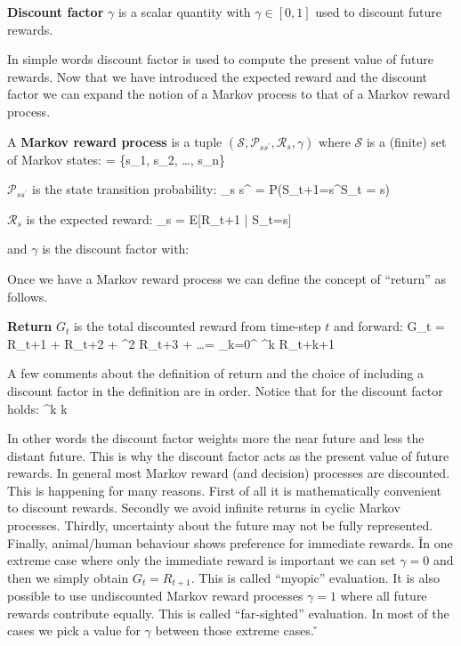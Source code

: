 \textbf{Discount factor} $\gamma$ is a scalar quantity with $\gamma \in [0,1]$ used to discount future rewards.
\ed

In simple words discount factor is used to compute the present value of future rewards. Now that we have introduced 
the expected reward and the discount factor we can expand the notion of a Markov process to that of a Markov reward 
process.

A \textbf{Markov reward process} is a tuple $(\mathcal{S}, \mathcal{P}_{s s^\prime}, \mathcal{R}_{s}, \gamma)$ 
where $\mathcal{S}$ is a (finite) set of Markov states:
\bse
{} = \{s_1, s_2, \ldots, s_n\}
\ese

$\mathcal{P}_{s s^\prime}$ is the state transition probability:
\bse
{}_{s s^\prime} = P(S_{t+1}=s^\prime \mid S_{t} = s)
\ese

$\mathcal{R}_{s}$ is the expected reward:
\bse
{}_{s} = E[R_{t+1} | S_t=s]
\ese

and $\gamma$ is the discount factor with:
\bse
\gamma \in [0,1]
\ese
\ed

Once we have a Markov reward process we can define the concept of ``return'' as follows.

\bd[Return]
\textbf{Return} $G_t$ is the total discounted reward from time-step $t$ and forward:
\bse
G_t = R_{t+1} + \gamma R_{t+2} + \gamma^2 R_{t+3} + \ldots = \sum_{k=0}^{\infty} \gamma^k R_{t+k+1}
\ese
\ed

A few comments about the definition of return and the choice of including a discount factor in the definition are in 
order. Notice that for the discount factor holds:
\bse
\gamma \in [0,1] \Rightarrow \gamma^k   k \to \infty
\ese

In other words the discount factor weights more the near future and less the distant future. This is why the discount
factor acts as the present value of future rewards. In general most Markov reward (and decision) processes are 
discounted. This is happening for many reasons. First of all it is mathematically convenient to discount rewards. 
Secondly we avoid infinite returns in cyclic Markov processes. Thirdly, uncertainty about the future may not be fully
represented. Finally, animal/human behaviour shows preference for immediate rewards. \v

In one extreme case where only the immediate reward is important we can set $\gamma = 0$ and then we simply obtain 
$G_t = R_{t+1}$. This is called ``myopic'' evaluation. It is also possible to use undiscounted Markov reward processes
$\gamma = 1$ where all future rewards contribute equally. This is called ``far-sighted'' evaluation. In most of the 
cases we pick a value for $\gamma$ between those extreme cases. \v

